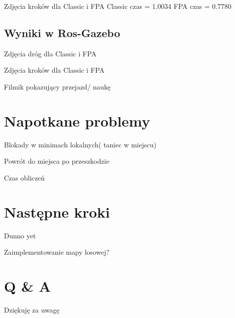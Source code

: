 \documentclass[aspectratio=169,15pt,]{beamer}
\begin{document}
\begin{frame}
Zdjęcia kroków dla Classic i FPA
Classic czas = 1.0034
FPA czas = 0.7780
\end{frame}

\subsection{Wyniki w Ros-Gazebo}
\begin{frame}
	\subsectionpage
\end{frame}

\begin{frame}
Zdjęcia dróg dla Classic i FPA
\end{frame}

\begin{frame}
Zdjęcia kroków dla Classic i FPA
\end{frame}

\begin{frame}
Filmik pokazujący przejazd/ naukę
\end{frame}

\section{Napotkane problemy}
\begin{frame}
	\sectionpage
\end{frame}

\begin{frame}
Blokady w minimach lokalnych( taniec w miejscu)

Powrót do miejsca po przeszkodzie

Czas obliczeń

\end{frame}

\section{Następne kroki}
\begin{frame}
	\sectionpage
\end{frame}

\begin{frame}
Dunno yet

Zaimplementowanie mapy losowej?
\end{frame}

\section{Q \& A}
\begin{frame}
	\sectionpage

\end{frame}

\begin{frame}
\begin{center}
	\Huge{Dziękuję za uwagę}

\end{center}

\end{frame}
\end{document}
